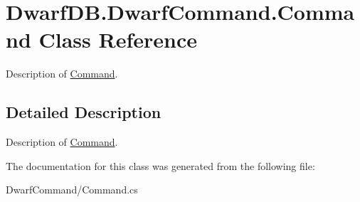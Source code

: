 \hypertarget{class_dwarf_d_b_1_1_dwarf_command_1_1_command}{
\section{DwarfDB.DwarfCommand.Command Class Reference}
\label{class_dwarf_d_b_1_1_dwarf_command_1_1_command}
}


Description of \hyperlink{class_dwarf_d_b_1_1_dwarf_command_1_1_command}{Command}.  




\subsection{Detailed Description}
Description of \hyperlink{class_dwarf_d_b_1_1_dwarf_command_1_1_command}{Command}. 

The documentation for this class was generated from the following file:\begin{DoxyCompactItemize}
\item 
DwarfCommand/Command.cs\end{DoxyCompactItemize}
